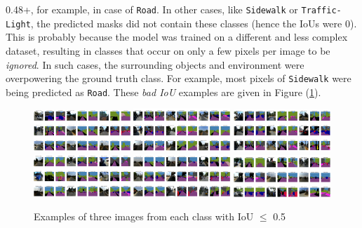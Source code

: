 \documentclass[10pt]{article}
\begin{document}
\begin{enumerate}[label=(\alph*)]
        0.48+, for example, in case of \texttt{Road}. In other cases, like \texttt{Sidewalk} or
        \texttt{Traffic-Light}, the predicted masks did not contain these classes (hence the IoUs were 0).
        This is probably because the model was trained on a different and less complex dataset,
        resulting in classes that occur on only a few pixels per image to be \textit{ignored}.
        In such cases, the surrounding objects and environment were overpowering the ground truth
        class. For example, most pixels of \texttt{Sidewalk} were being predicted as \texttt{Road}.
        These \textit{bad IoU} examples are given in Figure (\ref{fig:bad-ious}).
        \begin{figure}[h!]
            \centering
            \includegraphics[width=0.325\textwidth]{Assets/Segmentation/Bad-IoUs/01}
            \includegraphics[width=0.325\textwidth]{Assets/Segmentation/Bad-IoUs/02}
            \includegraphics[width=0.325\textwidth]{Assets/Segmentation/Bad-IoUs/03}
            \includegraphics[width=0.325\textwidth]{Assets/Segmentation/Bad-IoUs/04}
            \includegraphics[width=0.325\textwidth]{Assets/Segmentation/Bad-IoUs/05}
            \includegraphics[width=0.325\textwidth]{Assets/Segmentation/Bad-IoUs/06}
            \caption{Examples of three images from each class with IoU $\leq$ 0.5}
            \label{fig:bad-ious}
        \end{figure}
    \end{enumerate}
\end{document}
